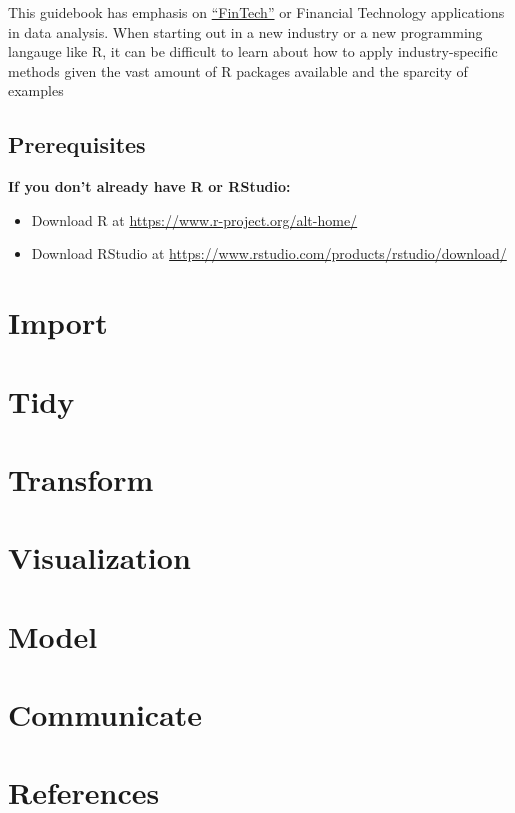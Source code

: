 \documentclass[]{book}
\providecommand{\tightlist}{%
  \setlength{\itemsep}{0pt}\setlength{\parskip}{0pt}}
\begin{document}
This guidebook has emphasis on
\href{https://en.wikipedia.org/wiki/Financial_technology}{``FinTech''}
or Financial Technology applications in data analysis. When starting out
in a new industry or a new programming langauge like R, it can be
difficult to learn about how to apply industry-specific methods given
the vast amount of R packages available and the sparcity of examples

\section{Prerequisites}\label{prerequisites}

\textbf{If you don't already have R or RStudio:}

\begin{itemize}
\tightlist
\item
  Download R at \url{https://www.r-project.org/alt-home/}
\item
  Download RStudio at
  \url{https://www.rstudio.com/products/rstudio/download/}
\end{itemize}

\chapter{Import}\label{import}

\chapter{Tidy}\label{tidy}

\chapter{Transform}\label{transform}

\chapter{Visualization}\label{viz}

\chapter{Model}\label{model}

\chapter{Communicate}\label{communicate}

\chapter{References}\label{references}


\end{document}
